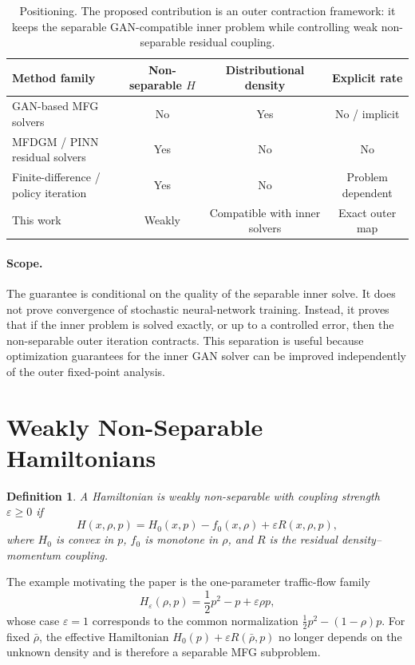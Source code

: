 \documentclass{article}
\newtheorem{definition}{Definition}
\newcommand{\eps}{\varepsilon}
\begin{document}
\begin{table}[t]
\centering
\begin{tabular}{lccc}
\toprule
Method family & Non-separable \(H\) & Distributional density & Explicit rate \\
\midrule
GAN-based MFG solvers & No & Yes & No / implicit \\
MFDGM / PINN residual solvers & Yes & No & No \\
Finite-difference / policy iteration & Yes & No & Problem dependent \\
This work & Weakly & Compatible with inner solvers & Exact outer map \\
\bottomrule
\end{tabular}
\caption{Positioning.  The proposed contribution is an outer contraction
framework: it keeps the separable GAN-compatible inner problem while controlling
weak non-separable residual coupling.}
\label{tab:positioning}
\end{table}

\paragraph{Scope.}
The guarantee is conditional on the quality of the separable inner solve.  It
does not prove convergence of stochastic neural-network training.  Instead, it
proves that if the inner problem is solved exactly, or up to a controlled
error, then the non-separable outer iteration contracts.  This separation is
useful because optimization guarantees for the inner GAN solver can be improved
independently of the outer fixed-point analysis.

\section{Weakly Non-Separable Hamiltonians}

\begin{definition}
A Hamiltonian is weakly non-separable with coupling strength \(\eps\geq0\) if
\begin{equation}
  H(x,\rho,p)=H_0(x,p)-f_0(x,\rho)+\eps R(x,\rho,p),
  \label{eq:decomp_neurips}
\end{equation}
where \(H_0\) is convex in \(p\), \(f_0\) is monotone in \(\rho\), and
\(R\) is the residual density--momentum coupling.
\end{definition}

The example motivating the paper is the one-parameter traffic-flow family
\begin{equation}
  H_\eps(\rho,p)=\frac12 p^2-p+\eps \rho p,
  \label{eq:traffic_family}
\end{equation}
whose case \(\eps=1\) corresponds to the common normalization
\(\frac12 p^2-(1-\rho)p\).  For fixed \(\bar\rho\), the effective Hamiltonian
\(H_0(p)+\eps R(\bar\rho,p)\) no longer depends on the unknown density and is
therefore a separable MFG subproblem.
\end{document}
